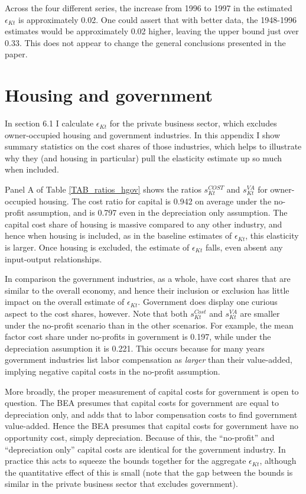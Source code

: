 \documentclass[11pt]{article}
\begin{document}
Across the four different series, the increase from 1996 to 1997 in the estimated $\epsilon_{Kt}$ is approximately 0.02. One could assert that with better data, the 1948-1996 estimates would be approximately 0.02 higher, leaving the upper bound just over 0.33. This does not appear to change the general conclusions presented in the paper. 

\section{Housing and government}
In section 6.1 I calculate $\epsilon_{Kt}$ for the private business sector, which excludes owner-occupied housing and government industries. In this appendix I show summary statistics on the cost shares of those industries, which helps to illustrate why they (and housing in particular) pull the elasticity estimate up so much when included. 

Panel A of Table \ref{TAB_ratios_hgov} shows the ratios $s^{COST}_{Kt}$ and $s^{VA}_{Kt}$ for owner-occupied housing. The cost ratio for capital is 0.942 on average under the no-profit assumption, and is 0.797 even in the depreciation only assumption. The capital cost share of housing is massive compared to any other industry, and hence when housing is included, as in the baseline estimates of $\epsilon_{Kt}$, this elasticity is larger. Once housing is excluded, the estimate of $\epsilon_{Kt}$ falls, even absent any input-output relationships. 

In comparison the government industries, as a whole, have cost shares that are similar to the overall economy, and hence their inclusion or exclusion has little impact on the overall estimate of $\epsilon_{Kt}$. Government does display one curious aspect to the cost shares, however. Note that both $s_{Kt}^{Cost}$ and $s_{Kt}^{VA}$ are smaller under the no-profit scenario than in the other scenarios. For example, the mean factor cost share under no-profits in government is 0.197, while under the depreciation assumption it is 0.221. This occurs because for many years government industries list labor compensation as \textit{larger} than their value-added, implying negative capital costs in the no-profit assumption. 

More broadly, the proper measurement of capital costs for government is open to question. The BEA presumes that capital costs for government are equal to depreciation only, and adds that to labor compensation costs to find government value-added. Hence the BEA presumes that capital costs for government have no opportunity cost, simply depreciation. Because of this, the ``no-profit'' and ``depreciation only'' capital costs are identical for the government industry. In practice this acts to squeeze the bounds together for the aggregate $\epsilon_{Kt}$, although the quantitative effect of this is small (note that the gap between the bounds is similar in the private business sector that excludes government).
\end{document}

